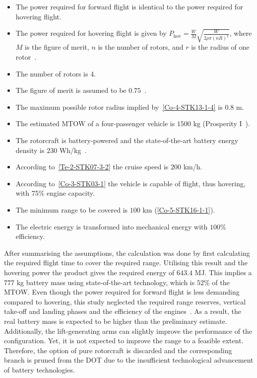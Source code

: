 \begin{itemize}
    \item The power required for forward flight is identical to the power required for hovering flight.
    \item The power required for hovering flight is given by $P_\text{hov} = \frac{W}{M}\sqrt{\frac{W}{2\rho\pi (n R)^2}}$, where $M$ is the figure of merit, $n$ is the number of rotors, and $r$ is the radius of one rotor~\cite{helicopter_dynamics}.
    \item The number of rotors is 4.
    \item The figure of merit is assumed to be $0.75$~\cite{Figure_of_merit}.
    \item The maximum possible rotor radius implied by~\ref{Co-4-STK13-1-4} is $0.8$ m.
    \item The estimated MTOW of a four-passenger vehicle is $1500$ kg (Prosperity I~\cite{prosperity}).
    \item The rotorcraft is battery-powered and the state-of-the-art battery energy density is $230$ Wh/kg~\cite{Batery_Density}.
    \item According to~\ref{Te-2-STK07-3-2} the cruise speed is $200$ km/h.
    \item According to~\ref{Co-3-STK03-1} the vehicle is capable of flight, thus hovering, with 75\% engine capacity.
    \item The minimum range to be covered is $100$ km (\ref{Co-5-STK16-1-1}).
    \item The electric energy is transformed into mechanical energy with $100$\% efficiency.
\end{itemize}

After summarising the assumptions, the calculation was done by first calculating the required flight time to cover the required range.
Utilising this result and the hovering power the product gives the required energy of $643.4$ MJ. This implies a $777$ kg battery mass using state-of-the-art technology, which is $52$\% of the MTOW. Even though the power required for forward flight is less demanding compared to hovering, this study neglected the required range reserves, vertical take-off and landing phases and the efficiency of the engines~\cite{helicopter_dynamics}.
As a result, the real battery mass is expected to be higher than the preliminary estimate.
Additionally, the lift-generating arms can slightly improve the performance of the configuration.
Yet, it is not expected to improve the range to a feasible extent.
Therefore, the option of pure rotorcraft is discarded and the corresponding branch is pruned from the DOT due to the insufficient technological advancement of battery technologies.

